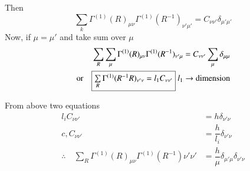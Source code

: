 Then
$$
\sum\limits_{k}\Gamma^{(1)}(R)_{\mu\nu}\Gamma^{(1)}(R^{-1})_{\nu'\mu'}=C_{\nu\nu'}\delta_{\mu'\mu'}
$$
Now, if $\mu=\mu'$ and take sum over $\mu$
\begin{align*}
& \sum\limits_{R}\sum\limits_{\mu}\Gamma^{(1)}(R)_{\mu\nu}\Gamma^{(1)}(R^{-1})_{\nu'\mu}=C_{\nu\nu'}\sum\limits_{\mu}\delta_{\mu\mu}\\
\text{or}\quad & \fbox{$\sum\limits_{R}\Gamma^{(1)}(R^{-1}R)_{\nu'\nu}=l_{1}C_{\nu\nu'}$} \ l_{1}\to \text{dimension}
\end{align*}

\smallskip

From above two equations
\begin{align*}
l_{i}C_{\nu\nu'} &= h\delta_{\nu'\nu}\\
c,C_{\nu\nu'} &= \dfrac{h}{l_{i}}\delta_{\nu'\nu}\\
\therefore\quad \sum\limits_{R}\Gamma^{(1)}(R)_{\mu\nu}\Gamma^{(1)}(R^{-1})\nu'\nu' &= \dfrac{h}{\mu}\delta_{\mu'\mu}\delta_{\nu'\nu}
\end{align*}

